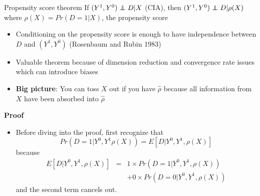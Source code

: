 \documentclass[notes=show]{beamer}
\newcommand\independent{\protect\mathpalette{\protect\independenT}{\perp}}
\def\independenT#1#2{\mathrel{\rlap{$#1#2$}\mkern2mu{#1#2}}}
\begin{document}
\begin{frame}[plain]
	
	\begin{block}{Propensity score theorem}
	If $(Y^1,Y^0)\independent{D}|X$ (CIA), then $(Y^1,Y^0)\independent{D} | \rho(X)$ where $\rho(X)=Pr(D=1|X)$, the propensity score
	\end{block}
	
	\begin{itemize}
	\item Conditioning on the propensity score is enough to have independence between $D$ and $(Y^1,Y^0)$ (Rosenbaum and Rubin 1983)\\
	 \item Valuable theorem because of dimension reduction and convergence rate issues which can introduce biases
	\item \textbf{Big picture}: You can toss $X$ out if you have $\widehat{\rho}$ because all information from $X$ have been absorbed into $\widehat{\rho}$
	\end{itemize}
\end{frame}

\begin{frame}[plain]
	\begin{center}
	\textbf{Proof}
	\end{center}
	
	\begin{itemize}
	\item Before diving into the proof, first recognize that$$Pr(D=1|Y^0,Y^1\rho(X)) = E[D | Y^0,Y^1,\rho(X)]$$because
		\begin{eqnarray*}
		E[D|Y^0,Y^1,\rho(X)] &=& 1\times Pr(D=1|Y^0,Y^1,\rho(X)) \\
		& & + 0 \times Pr(D=0 | Y^0,Y^1,\rho(X))
		\end{eqnarray*}and the second term cancels out.
		\end{itemize}
\end{frame}
\end{document}

